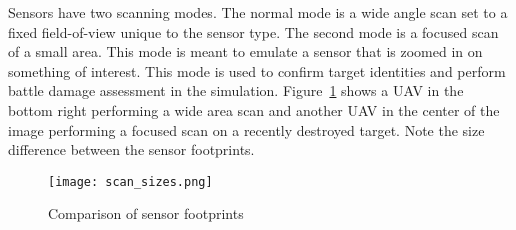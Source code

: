 
Sensors have two scanning modes.  The normal mode is a wide angle scan set to a fixed field-of-view unique to the sensor type.  The second mode is a focused scan of a small area.  This mode is meant to emulate a sensor that is zoomed in on something of interest.  This mode is used to confirm target identities and perform battle damage assessment in the simulation.  Figure~\ref{fig:scan_sizes} shows a UAV in the bottom right performing a wide area scan and another UAV in the center of the image performing a focused scan on a recently destroyed target.  Note the size difference between the sensor footprints.


\begin{figure}[H]
	\centering
	\texttt{[image: scan\_sizes.png]}
	\caption{Comparison of sensor footprints}
	\label{fig:scan_sizes}
\end{figure}



